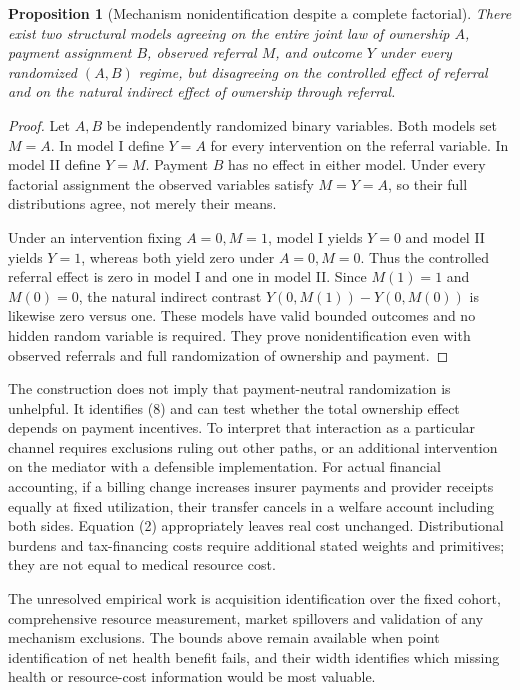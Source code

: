 \documentclass[11pt]{article}
\newtheorem{proposition}[theorem]{Proposition}
\theoremstyle{remark}
\begin{document}
\begin{proposition}[Mechanism nonidentification despite a complete factorial]
There exist two structural models agreeing on the entire joint law of ownership $A$, payment assignment $B$, observed referral $M$, and outcome $Y$ under every randomized $(A,B)$ regime, but disagreeing on the controlled effect of referral and on the natural indirect effect of ownership through referral.
\end{proposition}
\begin{proof}
Let $A,B$ be independently randomized binary variables. Both models set $M=A$. In model I define $Y=A$ for every intervention on the referral variable. In model II define $Y=M$. Payment $B$ has no effect in either model. Under every factorial assignment the observed variables satisfy $M=Y=A$, so their full distributions agree, not merely their means.

Under an intervention fixing $A=0,M=1$, model I yields $Y=0$ and model II yields $Y=1$, whereas both yield zero under $A=0,M=0$. Thus the controlled referral effect is zero in model I and one in model II. Since $M(1)=1$ and $M(0)=0$, the natural indirect contrast $Y(0,M(1))-Y(0,M(0))$ is likewise zero versus one. These models have valid bounded outcomes and no hidden random variable is required. They prove nonidentification even with observed referrals and full randomization of ownership and payment.
\end{proof}

The construction does not imply that payment-neutral randomization is unhelpful. It identifies (8) and can test whether the total ownership effect depends on payment incentives. To interpret that interaction as a particular channel requires exclusions ruling out other paths, or an additional intervention on the mediator with a defensible implementation. For actual financial accounting, if a billing change increases insurer payments and provider receipts equally at fixed utilization, their transfer cancels in a welfare account including both sides. Equation (2) appropriately leaves real cost unchanged. Distributional burdens and tax-financing costs require additional stated weights and primitives; they are not equal to medical resource cost.

The unresolved empirical work is acquisition identification over the fixed cohort, comprehensive resource measurement, market spillovers and validation of any mechanism exclusions. The bounds above remain available when point identification of net health benefit fails, and their width identifies which missing health or resource-cost information would be most valuable.
\end{document}
